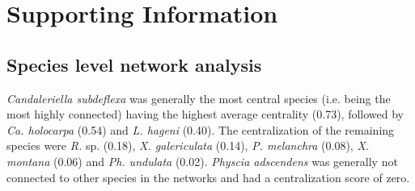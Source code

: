 \section{Supporting Information}



\subsection{Species level network analysis}


\textit{Candaleriella subdeflexa} was generally the most central
species (i.e. being the most highly connected) having the highest
average centrality (0.73), followed by \textit{Ca. holocarpa} (0.54)
and \textit{L. hageni} (0.40). The centralization of the remaining
species were \textit{R.}  sp. (0.18), \textit{X. galericulata} (0.14),
\textit{P. melanchra} (0.08), \textit{X. montana} (0.06) and
\textit{Ph. undulata} (0.02). \textit{Physcia adscendens} was
generally not connected to other species in the networks and had a
centralization score of zero.

